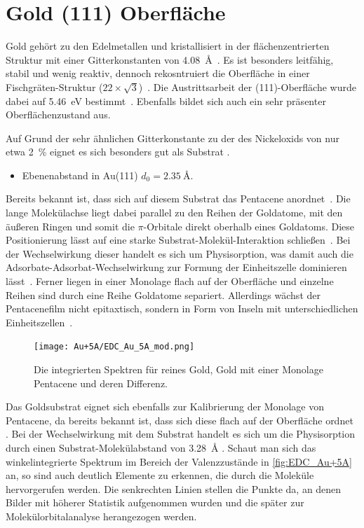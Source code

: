    \section{Gold (111) Oberfläche}
        Gold gehört zu den Edelmetallen und kristallisiert in der flächenzentrierten Struktur mit einer Gitterkonstanten von \SI{4.08}{\angstrom}~\cite{Marx}.
        Es ist besonders leitfähig, stabil und wenig reaktiv, dennoch rekosntruiert die Oberfläche in einer Fischgräten-Struktur ($\num{22} \times \sqrt{\num{3}}$)~\cite{5A_3}.
        Die Austrittsarbeit der (111)-Oberfläche wurde dabei auf \SI{5.46}{\electronvolt} bestimmt~\cite{5A_4}.
        Ebenfalls bildet sich auch ein sehr präsenter Oberflächenzustand aus.
        
        Auf Grund der sehr ähnlichen Gitterkonstante zu der des Nickeloxids von nur etwa \SI{2}{\percent} eignet es sich besonders gut als Substrat \cite{NiO_36}.
        \begin{itemize}
            \item Ebenenabstand in Au(111) $d_0 = \SI{2.35}{\angstrom}$.\textbf{\cite{5A_1}}
        \end{itemize}
        Bereits bekannt ist, dass sich auf diesem Substrat das Pentacene anordnet~\cite{5A_1, 5A_3}.
        Die lange Molekülachse liegt dabei parallel zu den Reihen der Goldatome, mit den äußeren Ringen und somit die $\pi$-Orbitale direkt oberhalb eines Goldatoms.
        Diese Positionierung lässt auf eine starke Substrat-Molekül-Interaktion schließen~\cite{5A_3}.
        Bei der Wechselwirkung dieser handelt es sich um Physisorption, was damit auch die Adsorbate-Adsorbat-Wechselwirkung zur Formung der Einheitszelle dominieren lässt~\cite{5A_4}.
        Ferner liegen in einer Monolage flach auf der Oberfläche und einzelne Reihen sind durch eine Reihe Goldatome separiert.
        Allerdings wächst der Pentacenefilm nicht epitaxtisch, sondern in Form von Inseln mit unterschiedlichen Einheitszellen~\cite{5A_3}.
        \begin{figure}
            \centering
            \texttt{[image: Au+5A/EDC\_Au\_5A\_mod.png]}
            \caption{Die integrierten Spektren für reines Gold, Gold mit einer Monolage Pentacene und deren Differenz.}
            \label{fig:EDC_Au+5A}
        \end{figure}
        Das Goldsubstrat eignet sich ebenfalls zur Kalibrierung der Monolage von Pentacene, da bereits bekannt ist, dass sich diese flach auf der Oberfläche ordnet \cite{5A_1}.
        Bei der Wechselwirkung mit dem Substrat handelt es sich um die Physisorption durch einen Substrat-Molekülabstand von \SI{3.28}{\angstrom} \cite{5A_1}.
        Schaut man sich das winkelintegrierte Spektrum im Bereich der Valenzzustände in \autoref{fig:EDC_Au+5A} an, so sind auch deutlich Elemente zu erkennen, die durch die Moleküle hervorgerufen werden.
        Die senkrechten Linien stellen die Punkte da, an denen Bilder mit höherer Statistik aufgenommen wurden und die später zur Molekülorbitalanalyse herangezogen werden.

